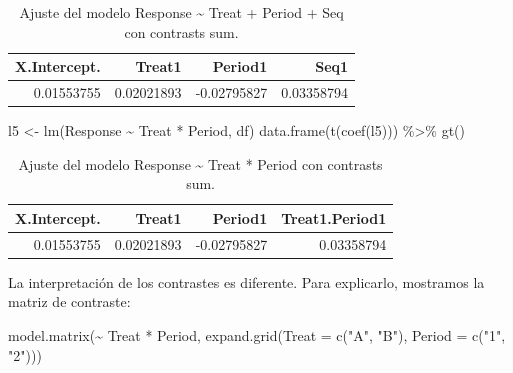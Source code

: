 \documentclass[
  12pt,
  a4paper,
  extrafontsizes,
  onecolumn,
  openright]{memoir}
\newenvironment{Shaded}{\begin{snugshade}}{\end{snugshade}}
\newcommand{\AttributeTok}[1]{\textcolor[rgb]{0.40,0.45,0.13}{#1}}
\newcommand{\FunctionTok}[1]{\textcolor[rgb]{0.28,0.35,0.67}{#1}}
\newcommand{\NormalTok}[1]{\textcolor[rgb]{0.00,0.23,0.31}{#1}}
\newcommand{\OtherTok}[1]{\textcolor[rgb]{0.00,0.23,0.31}{#1}}
\newcommand{\SpecialCharTok}[1]{\textcolor[rgb]{0.37,0.37,0.37}{#1}}
\newcommand{\StringTok}[1]{\textcolor[rgb]{0.13,0.47,0.30}{#1}}
\begin{document}
\hypertarget{tbl-l4}{}
\begin{longtable}{rrrr}
\caption{\label{tbl-l4}Ajuste del modelo Response \textasciitilde{} Treat + Period + Seq con
contrasts sum. }\tabularnewline

\toprule
X.Intercept. & Treat1 & Period1 & Seq1 \\ 
\midrule
0.01553755 & 0.02021893 & -0.02795827 & 0.03358794 \\ 
\bottomrule
\end{longtable}

\normalsize

\scriptsize

\begin{Shaded}
\begin{Highlighting}[]
\NormalTok{l5 }\OtherTok{\textless{}{-}} \FunctionTok{lm}\NormalTok{(Response }\SpecialCharTok{\textasciitilde{}}\NormalTok{ Treat }\SpecialCharTok{*}\NormalTok{ Period, df)}
\FunctionTok{data.frame}\NormalTok{(}\FunctionTok{t}\NormalTok{(}\FunctionTok{coef}\NormalTok{(l5))) }\SpecialCharTok{\%\textgreater{}\%} \FunctionTok{gt}\NormalTok{()}
\end{Highlighting}
\end{Shaded}

\hypertarget{tbl-l5}{}
\begin{longtable}{rrrr}
\caption{\label{tbl-l5}Ajuste del modelo Response \textasciitilde{} Treat * Period con
contrasts sum. }\tabularnewline

\toprule
X.Intercept. & Treat1 & Period1 & Treat1.Period1 \\ 
\midrule
0.01553755 & 0.02021893 & -0.02795827 & 0.03358794 \\ 
\bottomrule
\end{longtable}

\normalsize

La interpretación de los contrastes es diferente. Para explicarlo,
mostramos la matriz de contraste:

\scriptsize

\begin{Shaded}
\begin{Highlighting}[]
\FunctionTok{model.matrix}\NormalTok{(}\SpecialCharTok{\textasciitilde{}}\NormalTok{ Treat }\SpecialCharTok{*}\NormalTok{ Period, }\FunctionTok{expand.grid}\NormalTok{(}\AttributeTok{Treat =} \FunctionTok{c}\NormalTok{(}\StringTok{"A"}\NormalTok{, }\StringTok{"B"}\NormalTok{), }\AttributeTok{Period =} \FunctionTok{c}\NormalTok{(}\StringTok{"1"}\NormalTok{, }\StringTok{"2"}\NormalTok{)))}
\end{Highlighting}
\end{Shaded}
\end{document}
